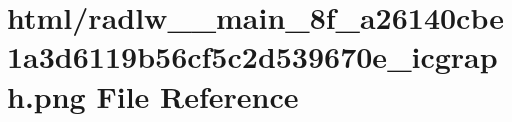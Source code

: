 \hypertarget{radlw____main__8f__a26140cbe1a3d6119b56cf5c2d539670e__icgraph_8png}{}\section{html/radlw\+\_\+\+\_\+main\+\_\+8f\+\_\+a26140cbe1a3d6119b56cf5c2d539670e\+\_\+icgraph.png File Reference}
\label{radlw____main__8f__a26140cbe1a3d6119b56cf5c2d539670e__icgraph_8png}
